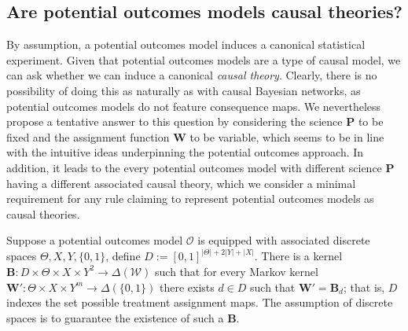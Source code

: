 
\subsection{Are potential outcomes models causal theories?}

By assumption, a potential outcomes model induces a canonical statistical experiment. Given that potential outcomes models are a type of causal model, we can ask whether we can induce a canonical \emph{causal theory}. Clearly, there is no possibility of doing this as naturally as with causal Bayesian networks, as potential outcomes models do not feature consequence maps. We nevertheless propose a tentative answer to this question by considering the science $\mathbf{P}$ to be fixed and the assignment function $\mathbf{W}$ to be variable, which seems to be in line with the intuitive ideas underpinning the potential outcomes approach. In addition, it leads to the every potential outcomes model with different science $\mathbf{P}$ having a different associated causal theory, which we consider a minimal requirement for any rule claiming to represent potential outcomes models as causal theories.

Suppose a potential outcomes model $\mathscr{O}$ is equipped with associated discrete spaces $\Theta,X,Y,\{0,1\}$, define $D:=[0,1]^{|\Theta|+2|Y|+|X|}$. There is a kernel $\mathbf{B}:D\times\Theta\times X \times Y^2\to \Delta(\mathcal{W})$ such that for every Markov kernel $\mathbf{W}':\Theta\times X\times Y^m\to \Delta(\{0,1\})$ there exists $d\in D$ such that $\mathbf{W}'=\mathbf{B}_d$; that is, $D$ indexes the set possible treatment assignment maps. The assumption of discrete spaces is to guarantee the existence of such a $\mathbf{B}$.

